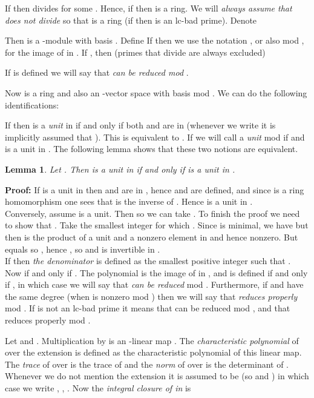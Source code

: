\documentclass[10pt]{article}
\newtheorem{lemma}{Lemma}
\newcommand{\bad}{lc-bad }
\begin{document}
If  then  divides 
for some . Hence, if  then  is a ring.
We will {\em always assume that  does not divide } so that  is a ring
(if  then  is an \bad prime).
Denote

Then  is a -module with basis .
Define 
If  then we use the notation , or also  mod ,
for the image of  in . If , then
(primes that divide  are always excluded)

If  is defined we will say that  {\em can be reduced mod} .


Now  is a ring and also an -vector space with
basis  mod . We can do the following identifications:



If  then  is a {\em unit} in  if and only if both  and 
are in   (whenever we write  it is implicitly assumed that ).
This is equivalent to .
If  we will call  a {\em unit} mod  if 
and  is a unit in . The following lemma shows
that these two notions are equivalent.

\begin{lemma}
\label{unitmodp}
Let . Then
 is a unit in 
if and only if  is a unit in .
\end{lemma}
{\bf Proof:}
If  is a unit in  then  and  are in , hence
 and  are defined,
and since  is a ring homomorphism 
one sees that
 is the inverse of . Hence
 is a unit in . \\
Conversely, assume  is a unit. Then 
so we can take . To finish the proof we
need to show that .
Take the smallest integer  for which .
Since  is minimal, we have 
but then  is the product of a unit
and a nonzero element in  and hence nonzero.
But  equals 
so , hence , so  and 
is invertible in .
\\


If  then
{\em the denominator}  is defined as
the smallest positive integer such that
.
Now  if and only if .
The polynomial  is the image of  in , and
is defined if and only if , in which case we 
will say that  {\em can be reduced} mod .
Furthermore, if  and  have the same degree
(when  is nonzero mod )
then we will say that  {\em reduces properly} mod .
If  is not an \bad prime it means
that  can be reduced mod , and that  reduces
properly mod .


Let  and .
Multiplication by  is an -linear map .
The {\em characteristic polynomial}  of  over
the extension  is defined as the characteristic polynomial of
this linear map.
The {\em trace}  of  over  is the trace of 
and the {\em norm}  of  over  is the determinant of .
Whenever we do not mention the extension  it is assumed to
be  (so  and ) in which case we
write , , .
Now the {\em integral closure of  in } is
\end{document}
